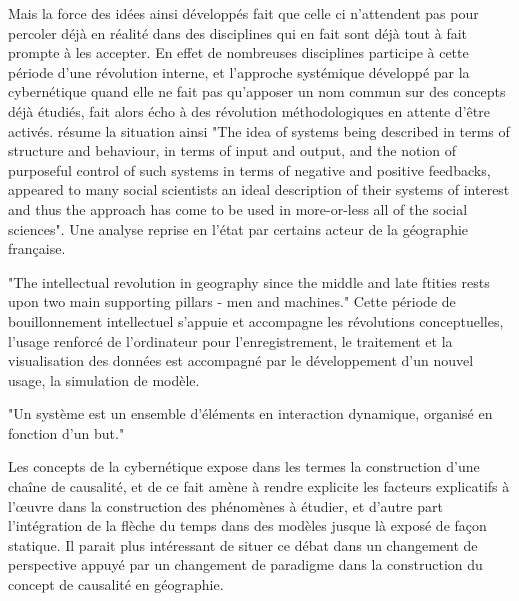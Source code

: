 { Mais la force des idées ainsi développés fait que celle ci n'attendent pas pour percoler déjà en réalité dans des disciplines qui en fait sont déjà tout à fait prompte à les accepter. En effet de nombreuses disciplines participe à cette période d'une révolution interne, et l'approche systémique développé par la cybernétique quand elle ne fait pas qu'apposer un nom commun sur des concepts déjà étudiés, fait alors écho à des révolution méthodologiques en attente d'être activés. \autocite[5]{Batty1976} résume la situation ainsi "The idea of systems being described in terms of structure and behaviour, in terms of input and output, and the notion of purposeful control of such systems in terms of negative and positive feedbacks, appeared to many social scientists an ideal description of their systems of interest and thus the approach has come to be used in more-or-less all of the social sciences". 
Une analyse reprise en l'état par certains acteur de la géographie française.

"The intellectual revolution in geography since the middle and late ftities rests upon two main supporting pillars - men and machines." \autocite{Gould1970} Cette période de bouillonnement intellectuel s'appuie et accompagne les révolutions conceptuelles, l'usage renforcé de l'ordinateur pour l'enregistrement, le traitement et la visualisation des données est accompagné par le développement d'un nouvel usage, la simulation de modèle.


"Un système est un ensemble d'éléments en interaction dynamique, organisé en fonction d'un but." \autocite{Rosnay1975}

Les concepts de la cybernétique expose dans les termes la construction d'une chaîne de causalité, et de ce fait amène à rendre explicite les facteurs explicatifs à l’œuvre dans la construction des phénomènes à étudier, et d'autre part l'intégration de la flèche du temps dans des modèles jusque là exposé de façon statique. Il parait plus intéressant de situer ce débat dans un changement de perspective appuyé par un changement de paradigme dans la construction du concept de causalité en géographie. 


}
